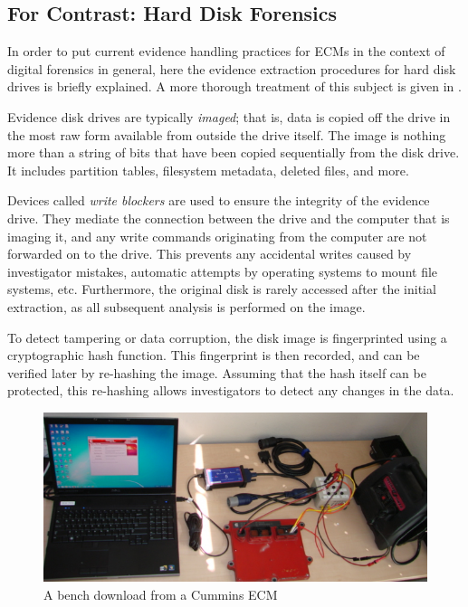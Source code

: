 \documentclass{report}
\begin{document}
\subsection{For Contrast: Hard Disk Forensics}

In order to put current evidence handling practices for ECMs in the context of digital forensics in general, here the evidence extraction
procedures for hard disk drives is briefly explained. A more thorough treatment of this subject is given in \cite{carrier2005}.

Evidence disk drives are typically \emph{imaged}; that is, data is copied off the drive in the most raw form available from outside
the drive itself. The image is nothing more than a string of bits that have been copied sequentially from the disk drive. It includes
partition tables, filesystem metadata, deleted files, and more.

Devices called \emph{write blockers} are used to ensure the integrity of the evidence drive. They mediate the connection between the
drive and the computer that is imaging it, and any write commands originating from the computer are not forwarded on to the drive.
This prevents any accidental writes caused by investigator mistakes, automatic attempts by operating systems to mount file systems, etc.
Furthermore, the original disk is rarely accessed after the initial extraction, as all subsequent analysis is performed on the image.

To detect tampering or data corruption, the disk image is fingerprinted using a cryptographic hash function. This fingerprint is then recorded,
and can be verified later by re-hashing the image. Assuming that the hash itself can be protected, this re-hashing allows investigators to
detect any changes in the data.

\begin{figure}[h]

  \includegraphics[scale=0.5]{cumminsbench}
  \caption{A bench download from a Cummins ECM}
  \label{fig:cumminsbench}
\end{figure}
\end{document}

